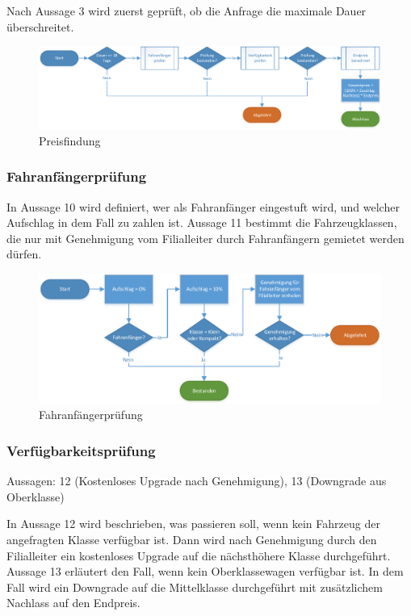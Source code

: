 Nach Aussage 3 wird zuerst geprüft, ob die Anfrage die maximale Dauer überschreitet.

\begin{figure}[tbh]
\centering
\includegraphics[width=1.0\linewidth]{Bilder/Preis_berechnen}
\caption{Preisfindung}
\label{fig:Preis_berechnen}
\end{figure}

\subsubsection{Fahranfängerprüfung}

In Aussage 10 wird definiert, wer als Fahranfänger eingestuft wird, und welcher Aufschlag in dem 
Fall zu zahlen ist. Aussage 11 bestimmt die Fahrzeugklassen, die nur mit Genehmigung vom Filialleiter
durch Fahranfängern gemietet werden dürfen.

\begin{figure}[H]
\centering
\includegraphics[width=0.8\linewidth]{Bilder/Fahranfaenger_pruefen}
\caption{Fahranfängerprüfung}
\label{fig:Fahranfänger_prüfen}
\end{figure}

\subsubsection{Verfügbarkeitsprüfung}

Aussagen: 12 (Kostenloses Upgrade nach Genehmigung), 13 (Downgrade aus Oberklasse)

In Aussage 12 wird beschrieben, was passieren soll, wenn kein Fahrzeug der angefragten Klasse
verfügbar ist. Dann wird nach Genehmigung durch den Filialleiter ein kostenloses Upgrade 
auf die nächsthöhere Klasse durchgeführt. 
Aussage 13 erläutert den Fall, wenn kein Oberklassewagen verfügbar ist. In dem Fall wird
ein Downgrade auf die Mittelklasse durchgeführt mit zusätzlichem Nachlass auf den Endpreis.

